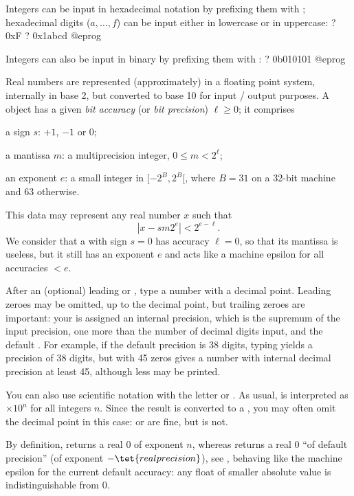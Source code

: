 Integers can be input in hexadecimal notation by prefixing them with
; hexadecimal digits ($a, \dots, f$) can be input either in lowercase
or in uppercase:
\bprog
? 0xF
? 0x1abcd
@eprog

Integers can also be input in binary by prefixing them with
:
\bprog
? 0b010101
@eprog

%

Real numbers are represented (approximately) in a floating point system,
internally in base 2, but converted to base 10 for input / output purposes.
A  object has a given \emph{bit accuracy} (or \emph{bit precision})
$\ell \geq 0$; it comprises

\item a sign $s$: $+1$, $-1$ or $0$;

\item a mantissa $m$: a multiprecision integer, $0\leq m < 2^\ell$;

\item an exponent $e$: a small integer in $[-2^B,2^B[$, where $B = 31$ on a
32-bit machine and 63 otherwise.

This data may represent any real number $x$ such that
$$|x - s m 2^e| < 2^{e-\ell}.$$
We consider that a  with sign $s = 0$ has accuracy $\ell = 0$, so
that its mantissa is useless, but it still has an exponent $e$ and acts like
a machine epsilon for all accuracies $< e$.

After an (optional) leading \kbd{+} or \kbd{-}, type a number with a decimal
point. Leading zeroes may be omitted, up to the decimal point, but trailing
zeroes are important: your  is assigned an internal precision,
which is the supremum of the input precision, one more than the number of
decimal digits input, and the default . For example, if
the default precision is 38 digits, typing  yields a precision of 38
digits, but  with 45 zeros gives a number with internal
decimal precision at least 45, although less may be printed.

You can also use scientific notation with the letter  or
. As usual,  is interpreted as $\times 10^n$ for all
integers $n$. Since the result is converted to a , you may often
omit the decimal point in this case:  or  are fine,
but  is not.

By definition,  returns a real $0$ of exponent $n$, whereas
 returns a real 0 ``of default precision'' (of exponent
$-\tet{realprecision}$), see , behaving like the machine
epsilon for the current default accuracy: any float of smaller absolute value
is indistinguishable from $0$.

